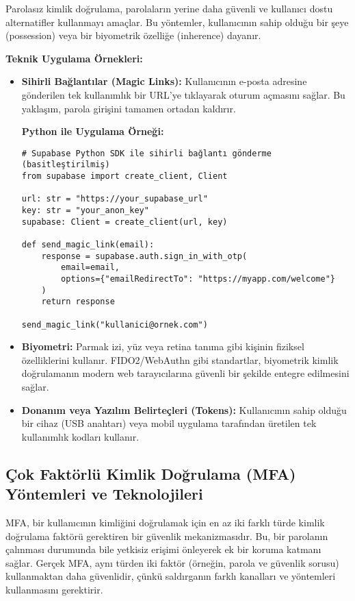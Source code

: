 Parolasız kimlik doğrulama, parolaların yerine daha güvenli ve kullanıcı dostu alternatifler kullanmayı amaçlar. Bu yöntemler, kullanıcının sahip olduğu bir şeye (possession) veya bir biyometrik özelliğe (inherence) dayanır.

\textbf{Teknik Uygulama Örnekleri:}
\begin{itemize}
    \item \textbf{Sihirli Bağlantılar (Magic Links):} Kullanıcının e-posta adresine gönderilen tek kullanımlık bir URL'ye tıklayarak oturum açmasını sağlar. Bu yaklaşım, parola girişini tamamen ortadan kaldırır.
    
    \textbf{Python ile Uygulama Örneği:}
\begin{verbatim}
# Supabase Python SDK ile sihirli bağlantı gönderme (basitleştirilmiş)
from supabase import create_client, Client

url: str = "https://your_supabase_url"
key: str = "your_anon_key"
supabase: Client = create_client(url, key)

def send_magic_link(email):
    response = supabase.auth.sign_in_with_otp(
        email=email,
        options={"emailRedirectTo": "https://myapp.com/welcome"}
    )
    return response

send_magic_link("kullanici@ornek.com")
\end{verbatim}
    
    \item \textbf{Biyometri:} Parmak izi, yüz veya retina tanıma gibi kişinin fiziksel özelliklerini kullanır. FIDO2/WebAuthn gibi standartlar, biyometrik kimlik doğrulamanın modern web tarayıcılarına güvenli bir şekilde entegre edilmesini sağlar.
    \item \textbf{Donanım veya Yazılım Belirteçleri (Tokens):} Kullanıcının sahip olduğu bir cihaz (USB anahtarı) veya mobil uygulama tarafından üretilen tek kullanımlık kodları kullanır.
\end{itemize}

\subsection{Çok Faktörlü Kimlik Doğrulama (MFA) Yöntemleri ve Teknolojileri}

MFA, bir kullanıcının kimliğini doğrulamak için en az iki farklı türde kimlik doğrulama faktörü gerektiren bir güvenlik mekanizmasıdır. Bu, bir parolanın çalınması durumunda bile yetkisiz erişimi önleyerek ek bir koruma katmanı sağlar. Gerçek MFA, aynı türden iki faktör (örneğin, parola ve güvenlik sorusu) kullanmaktan daha güvenlidir, çünkü saldırganın farklı kanalları ve yöntemleri kullanmasını gerektirir.

